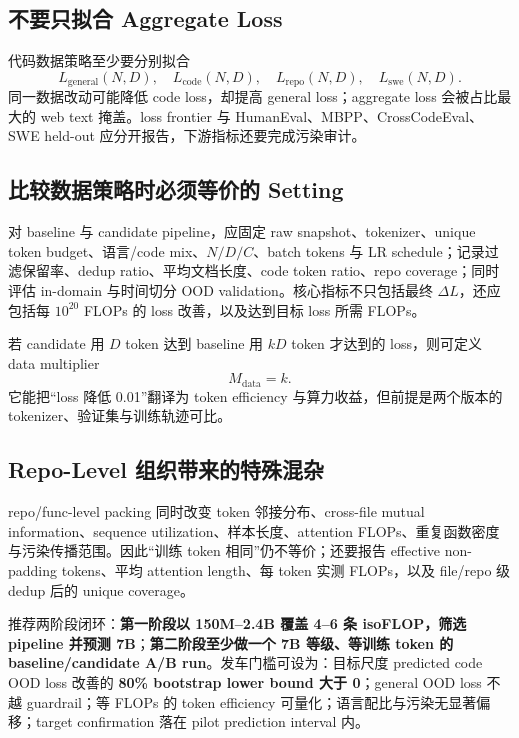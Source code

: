 \documentclass[UTF8,10pt,a4paper,fontset=none]{ctexart}
\begin{document}
\subsection{不要只拟合 Aggregate Loss}

代码数据策略至少要分别拟合
\begin{equation}
  L_{\mathrm{general}}(N,D),\quad L_{\mathrm{code}}(N,D),\quad
  L_{\mathrm{repo}}(N,D),\quad L_{\mathrm{swe}}(N,D).
  \label{eq:domain-losses}
\end{equation}
同一数据改动可能降低 code loss，却提高 general loss；aggregate loss 会被占比最大的 web text 掩盖。loss frontier 与 HumanEval、MBPP、CrossCodeEval、SWE held-out 应分开报告，下游指标还要完成污染审计。

\subsection{比较数据策略时必须等价的 Setting}

对 baseline 与 candidate pipeline，应固定 raw snapshot、tokenizer、unique token budget、语言/code mix、$N/D/C$、batch tokens 与 LR schedule；记录过滤保留率、dedup ratio、平均文档长度、code token ratio、repo coverage；同时评估 in-domain 与时间切分 OOD validation。核心指标不只包括最终 $\Delta L$，还应包括每 $10^{20}$ FLOPs 的 loss 改善，以及达到目标 loss 所需 FLOPs。

若 candidate 用 $D$ token 达到 baseline 用 $kD$ token 才达到的 loss，则可定义 data multiplier
\begin{equation}
  M_{\mathrm{data}}=k.
  \label{eq:data-multiplier}
\end{equation}
它能把“loss 降低 0.01”翻译为 token efficiency 与算力收益，但前提是两个版本的 tokenizer、验证集与训练轨迹可比。

\subsection{Repo-Level 组织带来的特殊混杂}

repo/func-level packing 同时改变 token 邻接分布、cross-file mutual information、sequence utilization、样本长度、attention FLOPs、重复函数密度与污染传播范围。因此“训练 token 相同”仍不等价；还要报告 effective non-padding tokens、平均 attention length、每 token 实测 FLOPs，以及 file/repo 级 dedup 后的 unique coverage。

推荐两阶段闭环：\textbf{第一阶段以 150M--2.4B 覆盖 4--6 条 isoFLOP，筛选 pipeline 并预测 7B}；\textbf{第二阶段至少做一个 7B 等级、等训练 token 的 baseline/candidate A/B run}。发车门槛可设为：目标尺度 predicted code OOD loss 改善的 \textbf{80\% bootstrap lower bound 大于 0}；general OOD loss 不越 guardrail；等 FLOPs 的 token efficiency 可量化；语言配比与污染无显著偏移；target confirmation 落在 pilot prediction interval 内。
\end{document}
